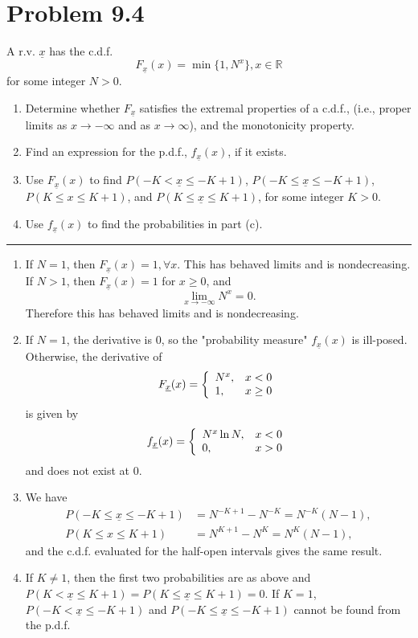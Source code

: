 \documentclass{article}
\newcommand{\horline}
           {\begin{center}
              \noindent\rule{8cm}{0.4pt}
            \end{center}}
\begin{document}
\section*{Problem 9.4}
A r.v. $\underline{x}$ has the c.d.f.
$$
F_{\underline{x}}(x) = \min\{1, N^x\}, x \in \mathbb{R}
$$
for some integer $N > 0$.
\begin{enumerate}[label=(\roman*)]
  \item{Determine whether $F_{\underline{x}}$ satisfies the extremal 
        properties of a c.d.f., (i.e., proper limits as $x \to -\infty$
        and as $x \to \infty$), and the monotonicity property.
       }
  \item{Find an expression for the p.d.f., $f_{\underline{x}}(x)$, if it
        exists.}
  \item{Use $F_{\underline{x}}(x)$ to find 
        $P(-K < \underline{x} \leq -K + 1)$, 
        $P(-K \leq \underline{x} \leq -K + 1)$,
        $P(K \leq x \leq K + 1)$, and
        $P(K \leq \underline{x} \leq K + 1)$,
        for some integer $K > 0$.
       }
  \item{Use $f_{\underline{x}}(x)$ to find the probabilities in part (c).}
\end{enumerate}
\horline 
\begin{enumerate}[label=(\roman*)]
  \item{If $N = 1$, then $F_{\underline{x}}(x) = 1, \forall x$. This has 
        behaved limits and is nondecreasing. If $N > 1$, then 
        $F_{\underline{x}}(x) = 1$ for $x \geq 0$, and 
        $$
        \lim_{x \to -\infty} N^x = 0.
        $$
        Therefore this has behaved limits and is nondecreasing.}
  \item{If $N = 1$, the derivative is 0, so the "probability measure" 
  $f_{\underline{x}}(x)$ is ill-posed. Otherwise, the derivative of
  $$
  F_{\underline{x}}(x) = \left\{\begin{array}{l l}
     N^x, & x < 0 \\
     1,   & x \geq 0
  \end{array}\right.
  $$
  is given by
  $$
  f_{\underline{x}}(x) = \left\{\begin{array}{l l}
    N^x \ln N, & x < 0 \\
    0,         & x > 0
  \end{array}\right.
  $$
  and does not exist at 0.}
  \item{We have
  \begin{align*}
  P(-K \leq \underline{x} \leq -K + 1) &=
  N^{-K+1} - N^{-K} = N^{-K}(N - 1),\\
  P(K \leq x \leq K + 1) &=
    N^{K+1} - N^K = N^K (N - 1),
  \end{align*}
  and the c.d.f. evaluated for the half-open intervals
  gives the same result.
  }
  \item{
  If $K \neq 1$, then the first two probabilities are as above and
  $P(K < \underline{x} \leq K + 1) = P(K \leq \underline{x} \leq K+1) = 0$.
  If $K = 1$,
  $P(-K < \underline{x} \leq -K+1)$ and $P(-K \leq \underline{x} \leq -K+1)$
  cannot be found from the p.d.f. 
  }
\end{enumerate}
\end{document}
